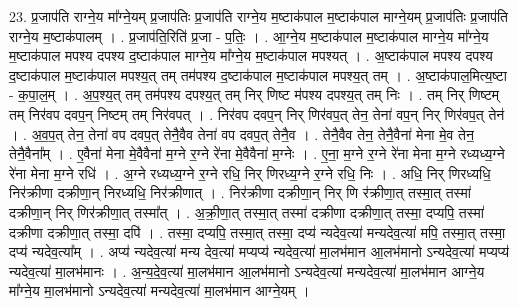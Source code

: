 \documentclass[17pt]{extarticle}
\begin{document}
23. प्र॒जाप॑ति राग्ने॒य मा᳚ग्ने॒यम् प्र॒जाप॑तिः प्र॒जाप॑ति राग्ने॒य म॒ष्टाक॑पाल म॒ष्टाक॑पाल माग्ने॒यम् प्र॒जाप॑तिः प्र॒जाप॑ति राग्ने॒य म॒ष्टाक॑पालम् । . प्र॒जाप॑ति॒रिति॑ प्र॒जा - प॒तिः॒ । . आ॒ग्ने॒य म॒ष्टाक॑पाल म॒ष्टाक॑पाल माग्ने॒य मा᳚ग्ने॒य म॒ष्टाक॑पाल मपश्य दपश्य द॒ष्टाक॑पाल माग्ने॒य मा᳚ग्ने॒य म॒ष्टाक॑पाल मपश्यत् । . अ॒ष्टाक॑पाल मपश्य दपश्य द॒ष्टाक॑पाल म॒ष्टाक॑पाल मपश्य॒त् तम् तम॑पश्य द॒ष्टाक॑पाल म॒ष्टाक॑पाल मपश्य॒त् तम् । . अ॒ष्टाक॑पाल॒मित्य॒ष्टा - क॒पा॒ल॒म् । . अ॒प॒श्य॒त् तम् तम॑पश्य दपश्य॒त् तम् निर् णिष्ट म॑पश्य दपश्य॒त् तम् निः । . तम् निर् णिष्टम् तम् निर॑वप दवप॒न् निष्टम् तम् निर॑वपत् । . निर॑वप दवप॒न् निर् णिर॑वप॒त् तेन॒ तेना॑ वप॒न् निर् णिर॑वप॒त् तेन॑ । . अ॒व॒प॒त् तेन॒ तेना॑ वप दवप॒त् तेनै॒वैव तेना॑ वप दवप॒त् तेनै॒व । . तेनै॒वैव तेन॒ तेनै॒वैना॑ मेना मे॒व तेन॒ तेनै॒वैना᳚म् । . ए॒वैना॑ मेना मे॒वैवैना॑ म॒ग्ने र॒ग्ने रे॑ना मे॒वैवैना॑ म॒ग्नेः । . ए॒ना॒ म॒ग्ने र॒ग्ने रे॑ना मेना म॒ग्ने रध्यध्य॒ग्ने रे॑ना मेना म॒ग्ने रधि॑ । . अ॒ग्ने रध्यध्य॒ग्ने र॒ग्ने रधि॒ निर् णिरध्य॒ग्ने र॒ग्ने रधि॒ निः । . अधि॒ निर् णिरध्यधि॒ निर॑क्रीणा दक्रीणा॒न् निरध्यधि॒ निर॑क्रीणात् । . निर॑क्रीणा दक्रीणा॒न् निर् णि र॑क्रीणा॒त् तस्मा॒त् तस्मा॑ दक्रीणा॒न् निर् णिर॑क्रीणा॒त् तस्मा᳚त् । . अ॒क्री॒णा॒त् तस्मा॒त् तस्मा॑ दक्रीणा दक्रीणा॒त् तस्मा॒ दप्यपि॒ तस्मा॑ दक्रीणा दक्रीणा॒त् तस्मा॒ दपि॑ । . तस्मा॒ दप्यपि॒ तस्मा॒त् तस्मा॒ दप्य॑ न्यदेव॒त्या॑ मन्यदेव॒त्या॑ मपि॒ तस्मा॒त् तस्मा॒ दप्य॑ न्यदेव॒त्या᳚म् । . अप्य॑ न्यदेव॒त्या॑ मन्य देव॒त्या॑ मप्यप्य॑ न्यदेव॒त्या॑ मा॒लभ॑मान आ॒लभ॑मानो ऽन्यदेव॒त्या॑ मप्यप्य॑ न्यदेव॒त्या॑ मा॒लभ॑मानः । . अ॒न्य॒दे॒व॒त्या॑ मा॒लभ॑मान आ॒लभ॑मानो ऽन्यदेव॒त्या॑ मन्यदेव॒त्या॑ मा॒लभ॑मान आग्ने॒य मा᳚ग्ने॒य मा॒लभ॑मानो ऽन्यदेव॒त्या॑ मन्यदेव॒त्या॑ मा॒लभ॑मान आग्ने॒यम् । \newline
\end{document}
